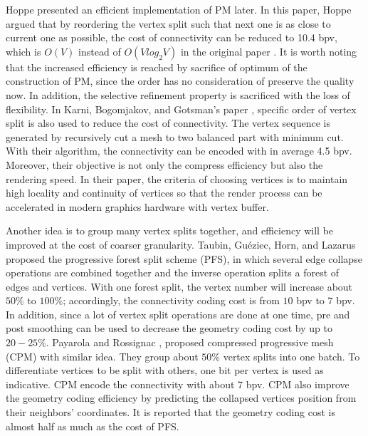 \documentclass[11pt, a4paper]{report}
\begin{document}
    Hoppe \cite{efficient:hoppe} presented an efficient implementation
    of PM later. In this paper, Hoppe argued that by reordering the
    vertex split such that next one is as close to current one as
    possible, the cost of connectivity can be reduced to 10.4 bpv,
    which is $O(V)$ instead of $O(Vlog_{2}V)$ in the original paper
    \cite{hoppe96progressive}. It is worth noting that the increased
    efficiency is reached by sacrifice of optimum of the construction
    of PM, since the order has no consideration of preserve the
    quality now. In addition, the selective refinement property is
    sacrificed with the loss of flexibility. In Karni, Bogomjakov, and
    Gotsman's paper \cite{602153}, specific order of vertex split is
    also used to reduce the cost of connectivity. The
    vertex sequence is generated by recursively cut a mesh to two
    balanced part with minimum cut. With their algorithm, the connectivity can
    be encoded with in average 4.5 bpv. Moreover, their objective is
    not only the compress efficiency but also the rendering speed. In
    their paper, the criteria of choosing vertices is to maintain high
    locality and continuity of vertices so that the render process can
    be accelerated in modern graphics hardware with vertex buffer. 

    Another idea is to group many vertex splits together, 
    and efficiency will be improved at the cost of coarser granularity. 
    Taubin, Gu\'{e}ziec, Horn, and Lazarus \cite{280834} proposed the
    progressive forest split scheme (PFS), in which several edge
    collapse operations are combined together and the inverse operation splits a
    forest of edges and vertices. With one forest split, the vertex
    number will increase about $50\%$ to $100\%$; accordingly, the
    connectivity coding cost is from $10$ bpv to $7$ bpv. In addition,
    since a lot of vertex split operations are done at one time, pre
    and post smoothing can be used to decrease the geometry coding
    cost by up to $20-25\%$. Payarola and Rossignac \cite{614450},
    proposed compressed progressive mesh (CPM)\label{cpm} with similar
    idea. They group about $50\%$ vertex splits into one batch. To
    differentiate vertices to be split with others, one bit per vertex
    is used as indicative. CPM encode the connectivity with about 7
    bpv. CPM also improve the geometry coding efficiency by predicting
    the collapsed vertices position from their neighbors' coordinates.
    It is reported that the geometry coding cost is almost half as
    much as the cost of PFS.
\end{document}
